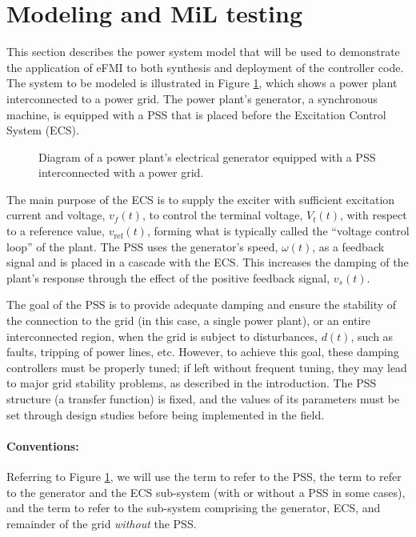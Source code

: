 \section{Modeling and MiL testing}\label{sec:modeling-for-mil-testing}

This section describes the power system model that will be used to demonstrate the application of eFMI to both synthesis and deployment of the controller code. The system to be modeled is illustrated in Figure \ref{fig:overview}, which shows a power plant interconnected to a power grid. The power plant's generator, a synchronous machine, is equipped with a PSS that is placed before the Excitation Control System (ECS). 

\begin{figure}[t!]
\centerline{}
    \caption{Diagram of a power plant's electrical generator equipped with a PSS interconnected with a power grid.}
    \label{fig:overview}
    \vspace{-0.1in}
\end{figure}

The main purpose of the ECS is to supply the exciter with sufficient excitation current and voltage, $v_f(t)$, to control the terminal voltage, $V_t(t)$, with respect to a reference value, $v_\mathrm{ref}(t)$, forming what is typically called the ``voltage control loop'' of the plant. The PSS uses the generator's speed, $\omega(t)$, as a feedback signal and is placed in a cascade with the ECS. This increases the damping of the plant's response through the effect of the positive feedback signal, $v_s(t)$. 

The goal of the PSS is to provide adequate damping and ensure the stability of the connection to the grid (in this case, a single power plant), or an entire interconnected region, when the grid is subject to disturbances, $d(t)$, such as faults, tripping of power lines, etc. However, to achieve this goal, these damping controllers must be properly tuned; if left without frequent tuning, they may lead to major grid stability problems, as described in the introduction. The PSS structure (a transfer function) is fixed, and the values of its parameters must be set through design studies before being implemented in the field.

\paragraph{Conventions:} Referring to Figure \ref{fig:overview}, we will use the term \controller{} to refer to the PSS, the term \generatorunit{} to refer to the generator and the ECS sub-system (with or without a PSS in some cases), and the term \plant{} to refer to the sub-system comprising the generator, ECS, and remainder of the grid \emph{without} the PSS.

